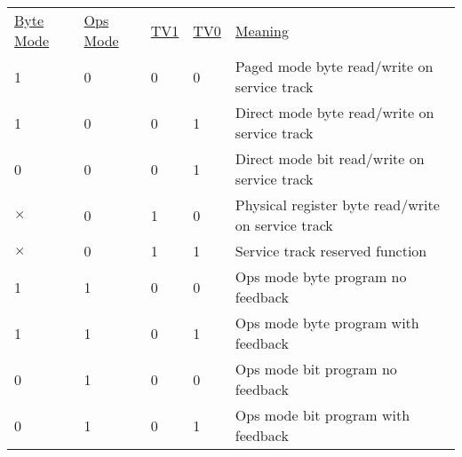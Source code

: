 \begin{tabular}{l l l l l}
\underline{Byte Mode} & \underline{Ops Mode} & \underline{TV1} & \underline{TV0} & \underline{Meaning} \\
1 & 0 & 0 & 0 & Paged mode byte read/write on service track\\
1 & 0 & 0 & 1 & Direct mode byte read/write on service track\\
0 & 0 & 0 & 1 & Direct mode bit read/write on service track\\
$\times$ & 0 & 1 & 0 & Physical register byte read/write on service track\\
$\times$ & 0 & 1 & 1 & Service track reserved function\\
1 & 1 & 0 & 0 & Ops mode byte program no feedback\\
1 & 1 & 0 & 1 & Ops mode byte program with feedback\\
0 & 1 & 0 & 0 & Ops mode bit program no feedback\\
0 & 1 & 0 & 1 & Ops mode bit program with feedback\\
\end{tabular}

